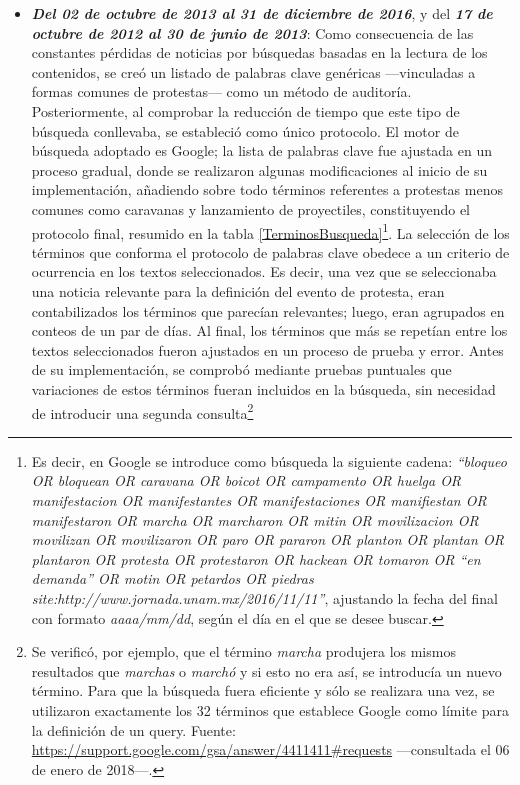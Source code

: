 \documentclass[letterpaper, 11pt]{book}
\theoremstyle{definition}
\theoremstyle{remark}
\begin{document}
\begin{itemize}
    
    \item \textbf{\emph{Del 02 de octubre de 2013 al 31 de diciembre de 2016}}, y del \textbf{\emph{17 de octubre de 2012 al 30 de junio de 2013}}: Como consecuencia de las constantes pérdidas de noticias por búsquedas basadas en la lectura de los contenidos, se creó un listado de palabras clave genéricas ---vinculadas a formas comunes de protestas--- como un método de auditoría. 
    Posteriormente, al comprobar la reducción de tiempo que este tipo de búsqueda conllevaba, se estableció como único protocolo. 
    El motor de búsqueda adoptado es Google; la lista de palabras clave fue ajustada en un proceso gradual, donde se realizaron algunas modificaciones al inicio de su implementación, añadiendo sobre todo términos referentes a protestas menos comunes como caravanas y lanzamiento de proyectiles, constituyendo el protocolo final, resumido en la tabla \ref{TerminosBusqueda}\footnote{
	Es decir, en Google se introduce como  búsqueda la siguiente cadena: \emph{``bloqueo OR bloquean OR caravana OR boicot OR campamento OR huelga OR manifestacion OR manifestantes OR manifestaciones OR manifiestan OR manifestaron OR marcha OR marcharon OR mitin OR movilizacion OR movilizan OR movilizaron OR paro OR pararon OR planton OR plantan OR plantaron OR protesta OR protestaron OR hackean OR tomaron OR ``en demanda'' OR motin OR petardos OR piedras site:http://www.jornada.unam.mx/2016/11/11''}, ajustando la fecha del final con formato \emph{aaaa/mm/dd}, según el día en el que se desee buscar.
    }. 
    La selección de los términos que conforma el protocolo de palabras clave obedece a un criterio de ocurrencia en los textos seleccionados. 
    Es decir, una vez que se seleccionaba una noticia relevante para la definición del evento de protesta, eran contabilizados los términos que parecían relevantes; luego, eran agrupados en conteos de un par de días. 
    Al final, los términos que más se repetían entre los textos seleccionados fueron ajustados en un proceso de prueba y error. 
    Antes de su implementación, se comprobó mediante pruebas puntuales que variaciones de estos términos fueran incluidos en la búsqueda, sin necesidad de introducir una segunda consulta\footnote{
	Se verificó, por ejemplo, que el término \emph{marcha} produjera los mismos resultados que \emph{marchas} o \emph{marchó} y si esto no era así, se introducía un nuevo término. 
	Para que la búsqueda fuera eficiente y sólo se realizara una vez, se utilizaron exactamente los 32 términos que establece Google como límite para la definición de un query. 
	Fuente: \url{https://support.google.com/gsa/answer/4411411\#requests} ---consultada el 06 de enero de 2018---.
}
\end{itemize}
\end{document}
